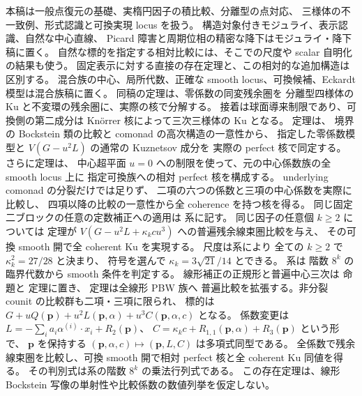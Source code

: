 本稿は一般点復元の基礎、実楕円因子の積比較、分離型の点対応、
三様体の不一致例、形式認識と可換実現 locus を扱う。
構造対象付きモジュライ、表示認識、自然な中心直線、
Picard 障害と周期位相の精密な降下はモジュライ・降下稿に置く。
自然な標的を指定する相対比較には、そこでの尺度や scalar 自明化の結果も使う。
固定表示に対する直接の存在定理と、この相対的な追加構造は区別する。
混合族の中心、局所代数、正確な smooth locus、可換候補、Eckardt 模型は混合族稿に置く。
同稿の定理は、零係数の同変残余圏を
分離型四様体の Ku と不変環の残余圏に、実際の核で分解する。
接着は球面導来制限であり、可換側の第二成分は Kn\"orrer 核によって三次三様体の Ku となる。
定理は、
境界の Bockstein 類の比較と comonad の高次構造の一意性から、
指定した零係数模型と $V(G-u^2L)$ の通常の Kuznetsov 成分を
実際の perfect 核で同定する。
さらに定理は、
中心超平面 $u=0$ への制限を使って、元の中心係数族の全 smooth locus 上に
指定可換族への相対 perfect 核を構成する。
underlying comonad の分裂だけでは足りず、
二項の六つの係数と三項の中心係数を実際に比較し、
四項以降の比較の一意性から全 coherence を持つ核を得る。
同じ固定二ブロックの任意の定数補正への適用は
系に記す。
同じ因子の任意個 $k\ge2$ については
定理が
$V(G-u^2L+\kappa_kcu^3)$ への普遍残余線束圏比較を与え、
その可換 smooth 開で全 coherent Ku を実現する。
尺度は系により
全ての $k\ge2$ で $\kappa_k^2=27/28$ と決まり、
符号を選んで $\kappa_k=3\sqrt{21}/14$ とできる。
系は
階数 $8^k$ の臨界代数から smooth 条件を判定する。
線形補正の正規形と普遍中心三次は
命題と
定理に置き、
定理は全線形 PBW 族へ
普遍比較を拡張する。非分裂 counit の比較群も二項・三項に限られ、
標的は $G+uQ(\mathbf p)+u^2L(\mathbf p,\alpha)+u^3C(\mathbf p,\alpha,c)$ となる。
係数変更は $L=-\sum_i a_i\alpha^{(i)}\cdot x_i+R_2(\mathbf p)$、
$C=\kappa_kc+R_{1,1}(\mathbf p,\alpha)+R_3(\mathbf p)$ という形で、
$\mathbf p$ を保持する $(\mathbf p,\alpha,c)\mapsto(\mathbf p,L,C)$ は多項式同型である。
全係数で残余線束圏を比較し、可換 smooth 開で相対 perfect 核と全 coherent Ku 同値を得る。
その判別式は系の階数 $8^k$ の乗法行列式である。
この存在定理は、線形 Bockstein 写像の単射性や比較係数の数値列挙を仮定しない。
